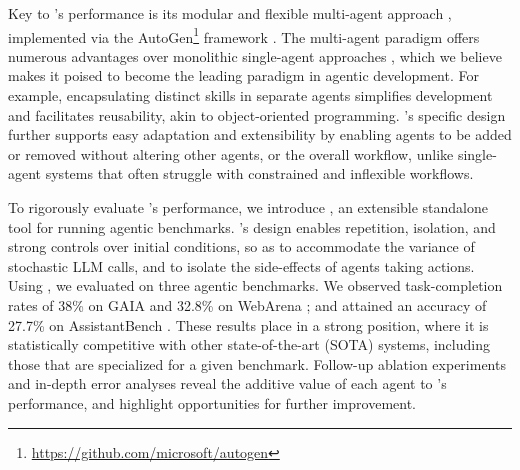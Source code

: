 Key to \team's performance is its modular and flexible multi-agent approach \cite{MASaSurvey2000,Messing2002AnIT,Tambe1998AgentTeams,guo2024large,talebirad2023multiagentcollaborationharnessingpower},  implemented via the AutoGen\footnote{\url{https://github.com/microsoft/autogen}} framework \cite{wu2023autogen}. The multi-agent paradigm offers numerous advantages over monolithic single-agent approaches \cite{MASaSurvey2000,Tambe1998AgentTeams,cheng2024exploring,xi2023risepotentiallargelanguage}, which we believe makes it poised to become the leading paradigm in agentic development. For example, encapsulating distinct skills in separate agents simplifies development and facilitates reusability, akin to object-oriented programming. \team's specific design further supports easy adaptation and extensibility by enabling agents to be added or removed without altering other agents, or the overall workflow, unlike single-agent systems that often struggle with constrained and inflexible workflows.

To rigorously evaluate \team's performance, we introduce \emph{\agbench{}}, an extensible standalone tool for running agentic benchmarks. \agbench{}'s design enables repetition, isolation, and strong controls over initial conditions, so as to accommodate the variance of stochastic LLM calls, and to isolate the side-effects of agents taking actions.  Using \agbench{}, we evaluated \team on three agentic benchmarks. We observed task-completion rates of 38\% on GAIA \cite{mialon2023gaiabenchmarkgeneralai} and 32.8\% on WebArena \cite{zhou2024webarenarealisticwebenvironment}; and attained an accuracy of 27.7\% on AssistantBench \cite{yoran2024assistantbenchwebagentssolve}. These results place  \team in a strong position, where it is statistically competitive with other state-of-the-art (SOTA) systems, including those that are specialized for a given benchmark.  
Follow-up ablation experiments and in-depth error analyses reveal the additive value of each agent to \team's performance, and highlight opportunities for further improvement. 

